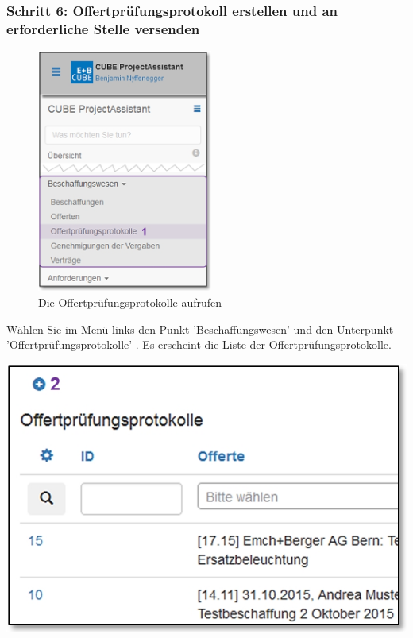 \pagebreak
\subsubsection{Schritt 6: Offertprüfungsprotokoll erstellen und an erforderliche Stelle versenden}

\begin{figure}
  \vspace{-30pt}      %
  \begin{center}
    \includegraphics[height=80mm]{../chapters/07_Beschaffungswesen/pictures/7-1-6_Menu_Besch_Offertp.jpg}
  \end{center}
  \vspace{-20pt}
  \caption{Die Offertprüfungsprotokolle aufrufen}
  \vspace{-10pt}
\end{figure}

Wählen Sie im Menü links den Punkt 'Beschaffungswesen' und den Unterpunkt 'Offertprüfungsprotokolle' . Es erscheint die Liste der Offertprüfungsprotokolle.

\begin{center}
\hspace{-15pt}   
\includegraphics[width=.75\linewidth]{../chapters/07_Beschaffungswesen/pictures/7-1-6_NeuesOffertPruefProtokoll.jpg}
\end{center}

